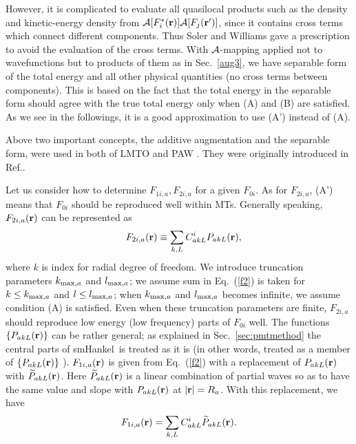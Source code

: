 \documentclass[a4paper,10pt,aip,onecolumn,amsmath,amssymb,floatfix,rmp]{revtex4-1}
\newcommand{\bfr}{{\bf r}}
\newcommand{\refeq}[1]{Eq.~(\ref{#1})}
\def\calR{{\cal A}}
\newcommand{\req}[1]{\mbox{Eq.~\!(\ref{#1})}}
\newcommand{\refsec}[1]{\mbox{Sec.~\!\ref{#1}}}
\def\smh{smHankel}
\def\wPakL{\widetilde{P}_{akL}}
\def\CiakL{C^i_{akL}}
\begin{document}
However, it is complicated to evaluate all quasilocal 
products such as the density and kinetic-energy density
from $\calR[F^*_i(\bfr)]\calR[F_j(\bfr')]$,
since it contains cross terms which connect different components.
Thus Soler and Williams \cite{soler89} 
gave a prescription to avoid the evaluation of the cross terms.
With $\calR$-mapping applied not to wavefunctions
but to products of them as in \refsec{aug3},
we have {separable form} of the 
total energy and all other physical quantities 
(no cross terms between components). This is based on the fact that
the total energy in the {separable form} should 
agree with the true total energy only when (A) and (B) are satisfied. 
As we see in the followings, it is a good approximation to use (A') instead of (A). 

Above two important concepts, 
the additive augmentation and the separable form, 
were used in both of LMTO and PAW \cite{lmfchap,PAW,kresse99}.
They were originally introduced in Ref.\cite{soler89}.

Let us consider how to determine $F_{1i,a},F_{2i,a}$ for
a given $F_{0i}$. As for $F_{2i,a}$, (A') means that 
$F_{0i}$ should be reproduced well within MTs.
Generally speaking, $F_{2i,a}(\bfr)$ can be represented as
\begin{eqnarray}
&&F_{2i,a}(\bfr) \equiv \sum_{k,L} \CiakL P_{akL}(\bfr), \label{f2}
\end{eqnarray}
where $k$ is index for radial degree of freedom. 
We introduce truncation parameters
$k_{{\rm max},a}$ and $l_{{\rm max},a}$; we assume 
sum in \req{f2} is taken for $k\le k_{{\rm max},a}$ and $l \le l_{{\rm max},a}$;
when $k_{{\rm max},a}$ and $l_{{\rm max},a}$ becomes infinite, we assume
condition (A) is satisfied. Even when these truncation
parameters are finite, $F_{2i,a}$ should reproduce
low energy (low frequency) parts of $F_{0i}$ well. 
The functions $\{P_{akL}(\bfr)\}$ can be rather general; 
as explained in \refsec{sec:pmtmethod}
the central parts of \smh\ is treated as it is
(in other words, treated as a member of $\{P_{akL}(\bfr)\}$ \cite{privatemark1}).
$F_{1i,a}(\bfr)$ is given from \refeq{f2}
with a replacement of ${P}_{akL}(\bfr)$ with $\widetilde{P}_{akL}(\bfr)$.
Here $\widetilde{P}_{akL}(\bfr)$ is a linear combination of
partial waves so as to have the same value and slope with
${P}_{akL}(\bfr)$ at $|\bfr|=R_a$. With this replacement, we have 
\begin{eqnarray}
F_{1i,a}(\bfr) = \sum_{k,L} C^i_{akL} \wPakL(\bfr). \label{f1}
\end{eqnarray}
\end{document}
